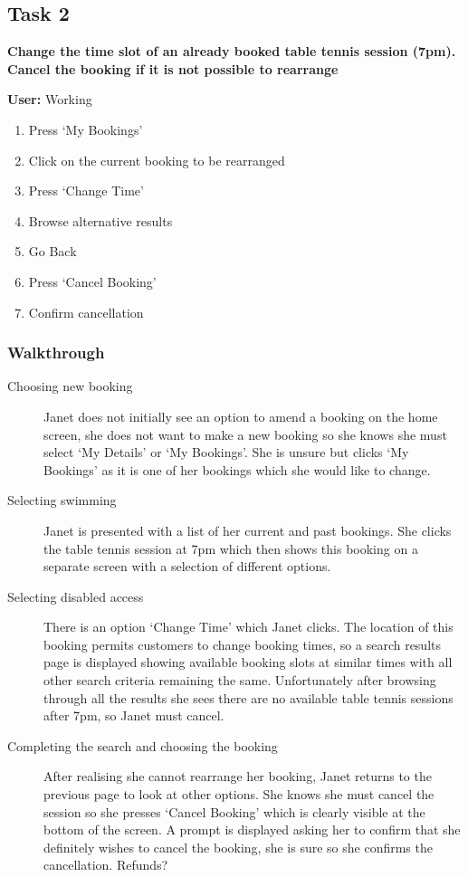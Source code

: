 \subsection{Task 2}
\label{ssub:task_2}

\textbf{Change the time slot of an already booked table tennis session (7pm).
Cancel the booking if it is not possible to rearrange}

\textbf{User:} Working
\begin{enumerate}
	\item Press `My Bookings'
	\item Click on the current booking to be rearranged
	\item Press `Change Time'
	\item Browse alternative results
	\item Go Back
	\item Press `Cancel Booking'
	\item Confirm cancellation
\end{enumerate}

\subsubsection{Walkthrough}

\begin{description}
	\item[Choosing new booking] Janet does not initially see an option to amend
		a booking on the home screen, she does not want to make a new booking
		so she knows she must select `My Details' or `My Bookings'. She is
		unsure but clicks `My Bookings' as it is one of her bookings which she
		would like to change.

	\item[Selecting swimming] Janet is presented with a list of her current and
		past bookings. She clicks the table tennis session at 7pm which then
		shows this booking on a separate screen with a selection of different
		options.

	\item[Selecting disabled access] There is an option `Change Time' which
		Janet clicks. The location of this booking permits customers to change
		booking times, so a search results page is displayed showing available
		booking slots at similar times with all other search criteria remaining
		the same. Unfortunately after browsing through all the results she sees
		there are no available table tennis sessions after 7pm, so Janet must
		cancel.

	\item[Completing the search and choosing the booking] After realising she
		cannot rearrange her booking, Janet returns to the previous page to
		look at other options. She knows she must cancel the session so she
		presses `Cancel Booking' which is clearly visible at the bottom of the
		screen. A prompt is displayed asking her to confirm that she definitely
		wishes to cancel the booking, she is sure so she confirms the
		cancellation. Refunds?
\end{description}

